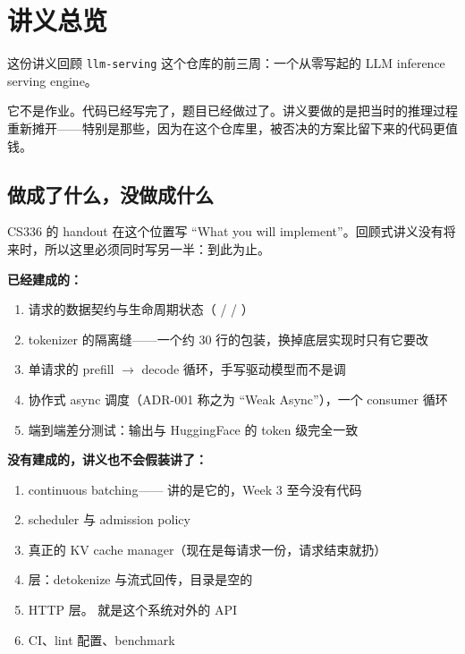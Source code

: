 \section{讲义总览}
\label{sec:a-overview}

这份讲义回顾 \texttt{llm-serving} 这个仓库的前三周：一个从零写起的 LLM inference serving engine。

它不是作业。代码已经写完了，题目已经做过了。讲义要做的是把当时的推理过程重新摊开——特别是那些，因为在这个仓库里，被否决的方案比留下来的代码更值钱。

\subsection{做成了什么，没做成什么}
\label{sec:a-scope}

CS336 的 handout 在这个位置写 ``What you will implement''。回顾式讲义没有将来时，所以这里必须同时写另一半：到此为止。

\textbf{已经建成的：}

\begin{enumerate}[label=\arabic*., itemsep=2pt]
  \item 请求的数据契约与生命周期状态（ /  / ）
  \item tokenizer 的隔离缝——一个约 30 行的包装，换掉底层实现时只有它要改
  \item 单请求的 prefill \(\rightarrow\) decode 循环，手写驱动模型而不是调 
  \item 协作式 async 调度（ADR-001 称之为 ``Weak Async''），一个 consumer 循环
  \item 端到端差分测试：输出与 HuggingFace 的  token 级完全一致
\end{enumerate}

\textbf{没有建成的，讲义也不会假装讲了：}

\begin{enumerate}[label=\arabic*., itemsep=2pt]
  \item continuous batching—— 讲的是它的，Week 3 至今没有代码
  \item scheduler 与 admission policy
  \item 真正的 KV cache manager（现在是每请求一份，请求结束就扔）
  \item {} 层：detokenize 与流式回传，目录是空的
  \item HTTP 层。 就是这个系统对外的 API
  \item CI、lint 配置、benchmark
\end{enumerate}

